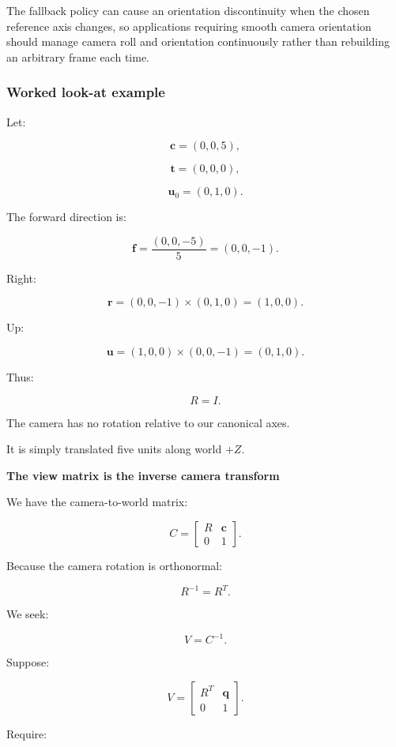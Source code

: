 The fallback policy can cause an orientation discontinuity when the chosen reference axis changes, so applications requiring smooth camera orientation should manage camera roll and orientation continuously rather than rebuilding an arbitrary frame each time.

\subsubsection{Worked look-at example}\label{02-foundations-ii-ch032-worked-look-at-example}

\hypertarget{02-foundations-ii-ch032-worked-look-at-example}{}

Let:

\[
 \mathbf c=(0,0,5),
\]

\[
 \mathbf t=(0,0,0),
\]

\[
 \mathbf u_0=(0,1,0).
\]

The forward direction is:

\[
 \mathbf f= \frac{(0,0,-5)}5 = (0,0,-1).
\]

Right:

\[
 \mathbf r=(0,0,-1)\times(0,1,0) =(1,0,0).
\]

Up:

\[
 \mathbf u=(1,0,0)\times(0,0,-1) =(0,1,0).
\]

Thus:

\[
 R=I.
\]

The camera has no rotation relative to our canonical axes.

It is simply translated five units along world \(+Z\).

\textbf{The view matrix is the inverse camera transform}

We have the camera-to-world matrix:

\[
 C= \begin{bmatrix} R&\mathbf c\\ 0&1 \end{bmatrix}.
\]

Because the camera rotation is orthonormal:

\[
 R^{-1}=R^T.
\]

We seek:

\[
 V=C^{-1}.
\]

Suppose:

\[
 V= \begin{bmatrix} R^T&\mathbf q\\ 0&1 \end{bmatrix}.
\]

Require:

